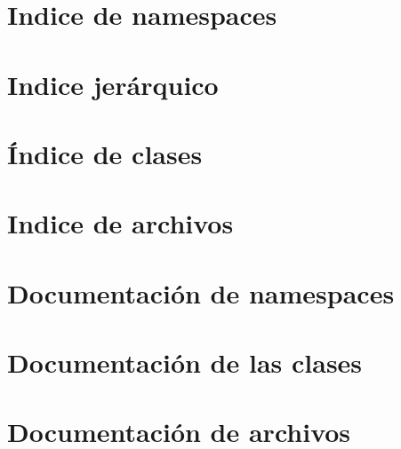 \documentclass[twoside]{article}
\begin{document}
\section{Indice de namespaces}

\section{Indice jerárquico}

\section{Índice de clases}

\section{Indice de archivos}

\section{Documentación de namespaces}

\section{Documentación de las clases}






\section{Documentación de archivos}



\newpage
{}
{}



\newpage
{}
{}
\printindex
\end{document}
